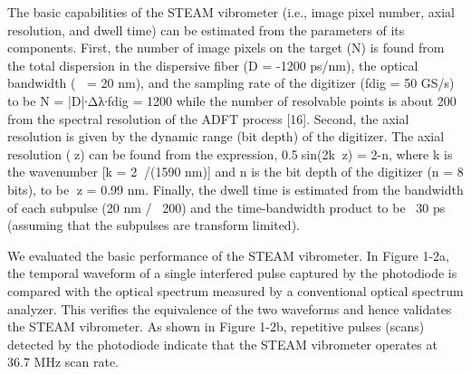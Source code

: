 The basic capabilities of the STEAM vibrometer (i.e., image pixel number, axial resolution, and dwell time) can be estimated from the parameters of its components. First, the number of image pixels on the target (N) is found from the total dispersion in the dispersive fiber (D = -1200 ps/nm), the optical bandwidth ( = 20 nm), and the sampling rate of the digitizer (fdig = 50 GS/s) to be N = |D|∙Δλ∙fdig = 1200 while the number of resolvable points is about 200 from the spectral resolution of the ADFT process [16]. Second, the axial resolution is given by the dynamic range (bit depth) of the digitizer. The axial resolution (z) can be found from the expression, 0.5sin(2kz) = 2-n, where k is the wavenumber [k = 2/(1590 nm)] and n is the bit depth of the digitizer (n = 8 bits), to be z = 0.99 nm. Finally, the dwell time is estimated from the bandwidth of each subpulse (20 nm / ~200) and the time-bandwidth product to be ~30 ps (assuming that the subpulses are transform limited).

We evaluated the basic performance of the STEAM vibrometer. In Figure 1-2a, the temporal waveform of a single interfered pulse captured by the photodiode is compared with the optical spectrum measured by a conventional optical spectrum analyzer. This verifies the equivalence of the two waveforms and hence validates the STEAM vibrometer. As shown in Figure 1-2b, repetitive pulses (scans) detected by the photodiode indicate that the STEAM vibrometer operates at 36.7 MHz scan rate.

